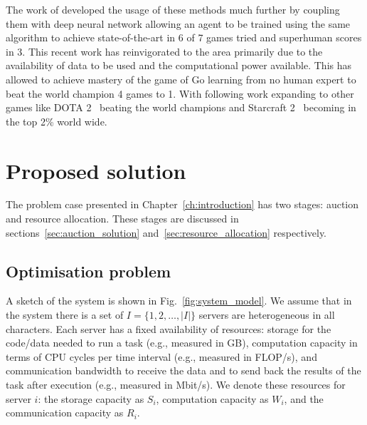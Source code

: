 The work of \cite{atari} developed the usage of these methods much further by coupling them with deep neural network
allowing an agent to be trained using the same algorithm to achieve state-of-the-art in 6 of 7 games tried and superhuman scores in
3. This recent work has reinvigorated to the area primarily due to the availability of data to be used and the computational power
available. This has allowed \cite{silver2017mastering} to achieve mastery of the game of Go learning from no human expert
to beat the world champion 4 games to 1. With following work expanding to other games like DOTA 2~\citep{OpenAI_dota} beating the
world champions and Starcraft 2~\citep{starcraft2} becoming in the top 2\% world wide.

\chapter{Proposed solution}\label{ch:proposed_solution}
The problem case presented in Chapter~\ref{ch:introduction} has two stages: auction and resource allocation.
These stages are discussed in sections~\ref{sec:auction_solution} and~\ref{sec:resource_allocation}
respectively.

\section{Optimisation problem}
A sketch of the system is shown in Fig.~\ref{fig:system_model}.
We assume that in the system there is a set of $I = \{1,2,\ldots,\left|I\right|\}$ servers are heterogeneous in all
characters. Each server has a fixed availability of resources: storage for the code/data needed to run a task
(e.g., measured in GB), computation capacity in terms of CPU cycles per time interval (e.g., measured in FLOP/s),
and communication bandwidth to receive the data and to send back the results of the task after execution (e.g., measured in Mbit/s).
We denote these resources for server $i$: the storage capacity as $S_i$, computation capacity as $W_i$, and the communication capacity as $R_i$.

